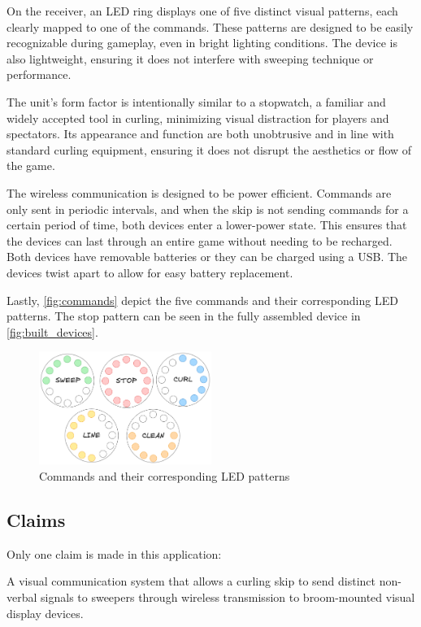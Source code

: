 \documentclass{article}
\begin{document}
On the receiver, an LED ring displays one of five distinct visual patterns, each clearly mapped to one of the commands. These patterns are designed to be easily recognizable during gameplay, even in bright lighting conditions. The device is also lightweight, ensuring it does not interfere with sweeping technique or performance.

The unit's form factor is intentionally similar to a stopwatch, a familiar and widely accepted tool in curling, minimizing visual distraction for players and spectators. Its appearance and function are both unobtrusive and in line with standard curling equipment, ensuring it does not disrupt the aesthetics or flow of the game.

The wireless communication is designed to be power efficient. Commands are only sent in periodic intervals, and when the skip is not sending commands for a certain period of time, both devices enter a lower-power state. This ensures that the devices can last through an entire game without needing to be recharged. Both devices have removable batteries or they can be charged using a USB. The devices twist apart to allow for easy battery replacement.


Lastly, \autoref{fig:commands} depict the five commands and their corresponding LED patterns. The stop pattern can be seen in the fully assembled device in \autoref{fig:built_devices}.  

\begin{figure}[ht!]
    \centering
    \includegraphics[width=0.5\textwidth]{commands.png}
    \caption{Commands and their corresponding LED patterns}
    \label{fig:commands}
\end{figure}


\subsection{Claims}
Only one claim is made in this application:

A visual communication system that allows a curling skip to send distinct non-verbal signals to sweepers through wireless transmission to broom-mounted visual display devices.



\end{document}
